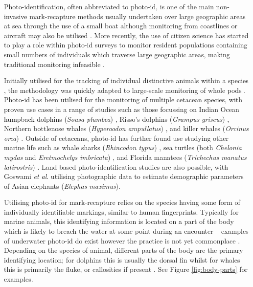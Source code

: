 Photo-identification, often abbreviated to photo-id, is one of the main non-invasive mark-recapture methods usually undertaken over large geographic areas at sea through the use of a small boat although monitoring from coastlines or aircraft may also be utilised \cite{hammond_individual_1990, evans_monitoring_2004, payne_long_1986, forney_seasonal_1998, wursig_methods_1990}. More recently, the use of citizen science has started to play a role within photo-id surveys to monitor resident populations containing small numbers of individuals which traverse large geographic areas, making traditional monitoring infeasible \cite{gibson_using_2020, cheney_integrating_2013}.

Initially utilised for the tracking of individual distinctive animals within a species \cite{caldwell_evidence_1955, schevill_daily_1960}, the methodology was quickly adapted to large-scale monitoring of whole pods \cite{alves_population_2013, franklin_migratory_2008}. Photo-id has been utilised for the monitoring of multiple cetacean species, with proven use cases in a range of studies such as those focussing on Indian Ocean humpback dolphins (\textit{Sousa plumbea}) \cite{sharpe_indian_2019}, Risso's dolphins (\textit{Grampus griseus}) \cite{miragliuolo_rissos_2004}, Northern bottlenose whales (\textit{Hyperoodon ampullatus}) \cite{feyrer_origin_2021}, and killer whales (\textit{Orcinus orca}) \cite{bigg_assessment_1982}. Outside of cetaceans, photo-id has further found use studying other marine life such as whale sharks (\textit{Rhincodon typus}) \cite{holmberg_estimating_2009}, sea turtles (both \textit{Chelonia mydas} and \textit{Eretmochelys imbricata}) \cite{reisser_photographic_2008}, and Florida manatees (\textit{Trichechus manatus latirostris}) \cite{langtimm_survival_2004}. Land based photo-identification studies are also possible, with Goswami \textit{et al}. \cite{goswami_application_2007} utilising photographic data to estimate demographic parameters of Asian elephants (\textit{Elephas maximus}).

Utilising photo-id for mark-recapture relies on the species having some form of individually identifiable markings, similar to human fingerprints. Typically for marine animals, this identifying information is located on a part of the body which is likely to breach the water at some point during an encounter -- examples of underwater photo-id do exist however the practice is not yet commonplace \cite{vanbressem_visual_2018, veronique_underwater_2022}. Depending on the species of animal, different parts of the body are the primary identifying location; for dolphins this is usually the dorsal fin whilst for whales this is primarily the fluke, or callosities if present \cite{vernazzani_eastern_2013, arnbom_individual_1987, constantine_abundance_2012, sharpe_indian_2019, baird_population_2009}. See Figure \ref{fig:body-parts} for examples.

